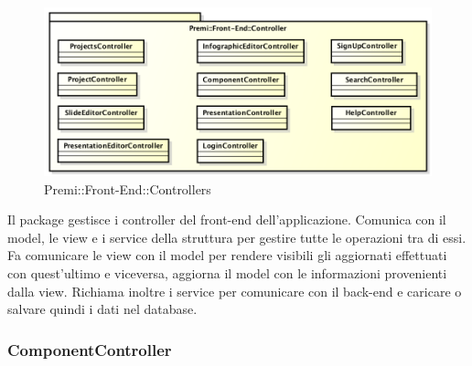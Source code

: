 \begin{figure}[h]
	\centering
	\includegraphics[width=0.7\linewidth]{img/premi_front_end_controllers}
	\caption[Premi::Front-End::Controllers]{Premi::Front-End::Controllers}
\end{figure}
Il package gestisce i controller del front-end dell'applicazione. Comunica con il model, le view e i service della struttura per gestire tutte le operazioni tra di essi. Fa comunicare le view con il model per rendere visibili gli aggiornati effettuati con quest'ultimo e viceversa, aggiorna il model con le informazioni provenienti dalla view. Richiama inoltre i service per comunicare con il back-end e caricare o salvare quindi i dati nel database.
\newpage

\subsubsection{ComponentController}
